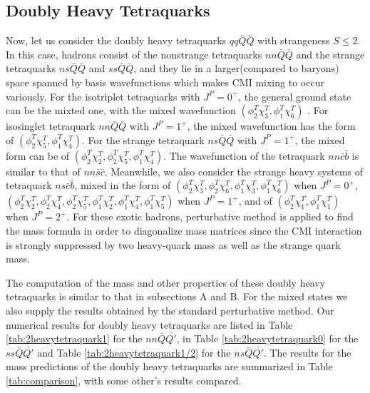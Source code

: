 \documentclass[prt,twocolumn,floatfix,nofootinbib]{revtex4}
\begin{document}
\subsection{Doubly Heavy Tetraquarks}
Now, let us consider the doubly heavy tetraquarks $qq\bar{Q}\bar{Q}$ with strangeness $S\leq 2$. In this case, hadrons consist of the nonstrange tetraquarks $nn\bar{Q}\bar{Q}$ and the strange tetraquarks $ns\bar{Q}\bar{Q}$ and $ss\bar{Q}\bar{Q}$, and they lie in a larger(compared to baryons) space spanned by basis wavefunctions which makes CMI mixing to occur variously. For the isotriplet tetraquarks with $J^{P}=0^{+}$, the general ground state can be the mixted one,  with the mixed wavefunction
$(\phi_{2}^{T}\chi_{3}^{T},\phi_{1}^{T}\chi_{6}^{T})$ . For isosinglet  tetraquark $nn\bar{Q}\bar{Q}$ with $J^{P}=1^{+}$, the mixed wavefunction has the form of $(\phi_{2}^{T}\chi_{5}^{T},\phi_{1}^{T}\chi_{4}^{T})$. For the strange tetraquark $ns\bar{Q}\bar{Q}$ with $J^{P}=1^{+}$, the mixed form can be of
$(\phi_{2}^{T}\chi_{2}^{T},\phi_{2}^{T}\chi_{5}^{T},\phi_{1}^{T}\chi_{4}^{T})$.
The wavefunction of the tetraquark $nn$$\bar{c}\bar{b}$ is similar to that of $nn\bar{s}\bar{c}$. Meanwhile, we also consider the strange heavy systems of tetraquark $ns\bar{c}\bar{b}$, mixed in the form of 
$(\phi_{2}^{T}\chi_{3}^{T},\phi_{2}^{T}\chi_{6}^{T},\phi_{1}^{T}\chi_{3}^{T},\phi_{1}^{T}\chi_{6}^{T})$ when $J^{P}=0^{+}$,
$(\phi_{2}^{T}\chi_{2}^{T},\phi_{2}^{T}\chi_{4}^{T},\phi_{2}^{T}\chi_{5}^{T},\phi_{1}^{T}\chi_{2}^{T},\phi_{1}^{T}\chi_{4}^{T},\phi_{1}^{T}\chi_{5}^{T})$ when $J^{P}=1^{+}$, and of
$(\phi_{2}^{T}\chi_{1}^{T},\phi_{1}^{T}\chi_{1}^{T})$ when $J^{P}=2^{+}$. For these exotic hadrons, perturbative method is applied to find the mass formula in order to diagonalize mass matrices since the CMI interaction is strongly suppressed by two heavy-quark mass as well as the strange quark mass.

The computation of the mass and other properties of these doubly heavy tetraquarks is similar to that in subsections A and B. For the mixed states we also supply the results obtained by the standard perturbative method.
Our numerical results for doubly heavy tetraquarks are listed in Table \ref{tab:2heavytetraquark1} for the $nn\bar{Q}\bar{Q\prime}$, in Table \ref{tab:2heavytetraquark0} for the $ss\bar{Q}\bar{Q\prime}$ and Table \ref{tab:2heavytetraquark1/2} for the $ns\bar{Q}\bar{Q\prime}$. The results for the mass predictions of the doubly heavy tetraquarks are summarized in Table \ref{tab:comparison}, with some other's results compared. 
\end{document}
